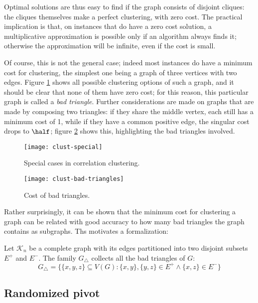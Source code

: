 Optimal solutions are thus easy to find if the graph consists of disjoint cliques: the cliques themselves make a perfect clustering, with zero cost. The practical implication is that, on instances that do have a zero cost solution, a multiplicative approximation is possible only if an algorithm always finds it; otherwise the approximation will be infinite, even if the cost is small.

Of course, this is not the general case; indeed most instances do have a minimum cost for clustering, the simplest one being a graph of three vertices with two edges. Figure \ref{fig:clust-special} shows all possible clustering options of such a graph, and it should be clear that none of them have zero cost; for this reason, this particular graph is called a \emph{bad triangle}. Further considerations are made on graphs that are made by composing two triangles: if they share the middle vertex, each still has a minimum cost of 1, while if they have a common positive edge, the singular cost drops to $\half$; figure \ref{fig:clust-bad-triangles} shows this, highlighting the bad triangles involved.

\begin{figure}
    \centering
    \texttt{[image: clust-special]}
    \caption{Special cases in correlation clustering.}
    \label{fig:clust-special}
\end{figure}

\begin{figure}
    \centering
    \texttt{[image: clust-bad-triangles]}
    \caption{Cost of bad triangles.}
    \label{fig:clust-bad-triangles}
\end{figure}

Rather surprisingly, it can be shown that the minimum cost for clustering a graph can be related with good accuracy to how many bad triangles the graph contains as subgraphs. Ths motivates a formalization:

\begin{definition}
    Let $\mathcal{K}_n$ be a complete graph with its edges partitioned into two disjoint subsets $E^+$ and $E^-$. The family $G_\triangle$ collects all the bad triangles of $G$:
    \[
        G_\triangle = \{ \{x, y, z\} \subseteq V(G) : \{x, y\}, \{y, z\} \in E^+ \wedge \{x, z\} \in E^-\}
    \]
\end{definition}


\subsection{Randomized pivot}\label{sec:random-pivot}

